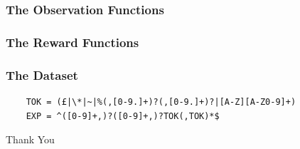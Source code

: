 \documentclass{beamer}
\begin{document}
\begin{frame}
\frametitle{The Observation Functions}
\end{frame}

\begin{frame}
\frametitle{The Reward Functions}
\end{frame}

\begin{frame}[fragile]
\frametitle{The Dataset}
  \begin{small}
    \begin{verbatim}
    TOK = (£|\*|~|%(,[0-9.]+)?(,[0-9.]+)?|[A-Z][A-Z0-9]+)
    EXP = ^([0-9]+,)?([0-9]+,)?TOK(,TOK)*$
    \end{verbatim}
  \end{small}
\end{frame}

\begin{frame}
\centering
\Huge
Thank You
\end{frame}
\end{document}
